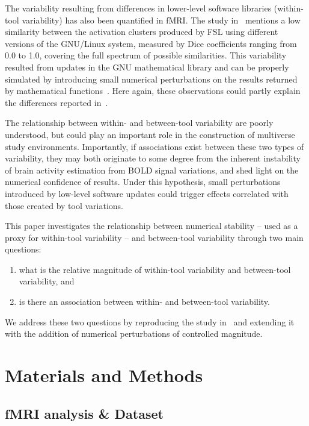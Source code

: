 \documentclass[11pt,onecolumn]{article}
\begin{document}
The variability resulting from differences in lower-level software
libraries (within-tool variability) has also been quantified in fMRI. The
study in~\cite{Glatard2015} mentions a low similarity between the activation clusters
produced by FSL using different versions of the GNU/Linux system, measured
by Dice coefficients ranging from 0.0 to 1.0, covering the full spectrum of
possible similarities. This variability resulted from updates in the GNU
mathematical library and can be properly simulated by introducing small
numerical perturbations on the results returned by mathematical functions~\cite{salari2021accurate}.
Here again, these observations could partly explain the differences
reported in~\cite{botvinik2020variability}.

The relationship between within- and between-tool variability are poorly
understood, but could play an important role in the construction of
multiverse study environments. Importantly, if associations exist between
these two types of variability, they may both originate to some degree from
the inherent instability of brain activity estimation from BOLD signal
variations, and shed light on the numerical confidence of results. Under
this hypothesis, small perturbations introduced by low-level software
updates could trigger effects correlated with those created by tool
variations.

This paper investigates the relationship between numerical stability -- used
as a proxy for within-tool variability -- and between-tool variability
through two main questions:
\begin{enumerate}
\item what is the relative magnitude of within-tool variability and between-tool variability, and
\item is there an association between within- and between-tool variability.
\end{enumerate}

We address these two questions by reproducing the study in~\cite{bowring2019exploring} and
extending it with the addition of numerical perturbations of controlled
magnitude.

\section{Materials and Methods}

\subsection{fMRI analysis \& Dataset}
\end{document}
